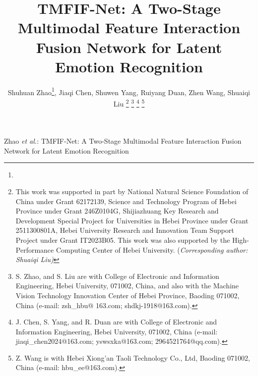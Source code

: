 \documentclass[lettersize,journal]{IEEEtran}
\begin{document}
\title{TMFIF-Net: A Two-Stage Multimodal Feature Interaction Fusion Network for Latent Emotion Recognition}

\author{Shuhuan Zhao\thanks{}, Jiaqi Chen, Shuwen Yang, Ruiyang Duan, Zhen Wang, Shuaiqi Liu
\thanks{This work was supported in part by National Natural Science Foundation of China under Grant 62172139, Science and Technology Program of Hebei Province under Grant 246Z0104G, Shijiazhuang Key Research and Development Special Project for Universities in Hebei Province under Grant 2511300801A, Hebei University Research and Innovation Team Support Project under Grant IT2023B05. This work was also supported by the High-Performance Computing Center of Hebei University. (\textit{Corresponding author: Shuaiqi Liu)}}
\thanks{S. Zhao, and S. Liu are with College of Electronic and Information 
Engineering, Hebei University, 071002, China, and also with the Machine Vision Technology Innovation Center of Hebei Province, Baoding 071002, China (e-mail: zsh\_hbu@ 163.com; shdkj-1918@163.com).}
\thanks{J. Chen, S. Yang, and R. Duan are with College of Electronic and Information 
Engineering, Hebei University, 071002, China (e-mail: jiaqi\_chen2024@163.com; yswsxka@163.com; 2964521764@qq.com).}
\thanks{Z. Wang is with Hebei Xiong'an Taoli Technology Co., Ltd, Baoding 071002, China (e-mail: hbu\_ee@163.com).}


}%


{ Zhao \MakeLowercase{\textit{et al.}}: TMFIF-Net: A Two-Stage Multimodal Feature Interaction Fusion Network for Latent Emotion Recognition}





\maketitle
\end{document}
